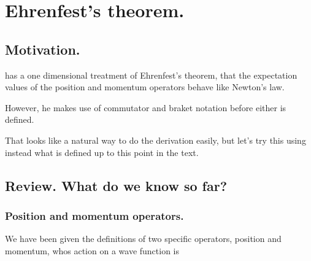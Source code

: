 
%
%


\chapter{Ehrenfest's theorem. }
\date{ Jan 22, 2009.  $RCSfile: ehrenfest.tex,v $ Last $Revision: 1.13 $ $Date: 2009/06/11 17:00:37 $ }

%


\section{Motivation. }

\cite{mcmahon2005qmd} has a one dimensional treatment of Ehrenfest's theorem,
that the expectation values of the position and momentum operators behave
like Newton's law.

However, he makes use
of commutator and braket notation before either is defined.

That looks like a natural way to do the derivation easily, but let's try
this using instead what is defined up to this point in the text.

\section{Review.  What do we know so far? }

\subsection{Position and momentum operators. }

We have been given the definitions of two specific operators, position and momentum, 
whos action on a wave function is

